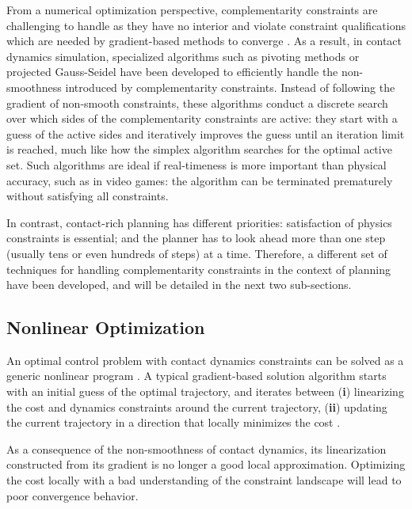 From a numerical optimization perspective, complementarity constraints are challenging to handle as they have no interior and violate constraint qualifications which are needed by gradient-based methods to converge \cite[]{biegler2010nonlinear}. As a result, in contact dynamics simulation, specialized algorithms such as pivoting methods or projected Gauss-Seidel \cite{SiggraphContact22} have been developed to efficiently handle the non-smoothness introduced by complementarity constraints. Instead of following the gradient of non-smooth constraints, these algorithms conduct a discrete search over which sides of the complementarity constraints are active: they start with a guess of the active sides and iteratively improves the guess until an iteration limit is reached, much like how the simplex algorithm searches for the optimal active set. Such algorithms are ideal if real-timeness is more important than physical accuracy, such as in video games: the algorithm can be terminated prematurely without satisfying all constraints. 

In contrast, contact-rich planning has different priorities: satisfaction of physics constraints is essential; and the planner has to look ahead more than one step (usually tens or even hundreds of steps) at a time. Therefore, a different set of techniques for handling complementarity constraints in the context of planning have been developed, and will be detailed in the next two sub-sections.

\subsection{Nonlinear Optimization}
\label{sec:intro:nonlinear_optimization}
An optimal control problem with contact dynamics constraints can be solved as a generic nonlinear program \cite{bertsekas1997nonlinear}. A typical gradient-based solution algorithm starts with an initial guess of the optimal trajectory, and iterates between (\textbf{i}) linearizing the cost and dynamics constraints around the current trajectory, (\textbf{ii}) updating the current trajectory in a direction that locally minimizes the cost \cite{gill2005snopt, todorov2005generalized}. 

As a consequence of the non-smoothness of contact dynamics, its linearization constructed from its gradient is no longer a good local approximation. Optimizing the cost locally with a bad understanding of the constraint landscape will lead to poor convergence behavior. 

